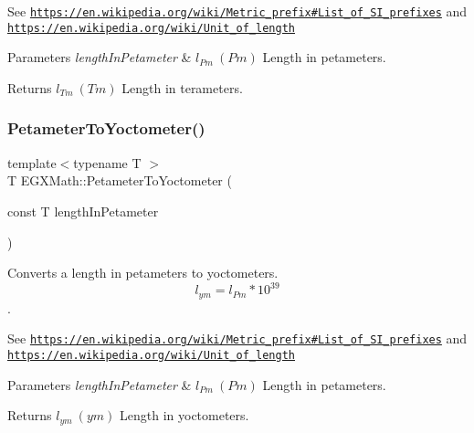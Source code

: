 See \href{https://en.wikipedia.org/wiki/Metric_prefix#List_of_SI_prefixes}{\tt https\+://en.\+wikipedia.\+org/wiki/\+Metric\+\_\+prefix\#\+List\+\_\+of\+\_\+\+S\+I\+\_\+prefixes} and \href{https://en.wikipedia.org/wiki/Unit_of_length}{\tt https\+://en.\+wikipedia.\+org/wiki/\+Unit\+\_\+of\+\_\+length} 
\begin{DoxyParams}{Parameters}
{\em length\+In\+Petameter} & $ l_{Pm}\ (Pm)$ Length in petameters. \\
\hline
\end{DoxyParams}
\begin{DoxyReturn}{Returns}
$ l_{Tm}\ (Tm)$ Length in terameters. 
\end{DoxyReturn}
\mbox{\label{group___e_g_x_math-_conversions-_length_conversions-_petameter-_s_i_ga6fd2701bf757e5a6ca26a0d506471433}} 
\subsubsection{\texorpdfstring{Petameter\+To\+Yoctometer()}{PetameterToYoctometer()}}
{\footnotesize\ttfamily template$<$typename T $>$ \\
T E\+G\+X\+Math\+::\+Petameter\+To\+Yoctometer (\begin{DoxyParamCaption}\item[{const T}]{length\+In\+Petameter }\end{DoxyParamCaption})}



Converts a length in petameters to yoctometers. \[ l_{ym}=l_{Pm} * 10^{39} \]. 

See \href{https://en.wikipedia.org/wiki/Metric_prefix#List_of_SI_prefixes}{\tt https\+://en.\+wikipedia.\+org/wiki/\+Metric\+\_\+prefix\#\+List\+\_\+of\+\_\+\+S\+I\+\_\+prefixes} and \href{https://en.wikipedia.org/wiki/Unit_of_length}{\tt https\+://en.\+wikipedia.\+org/wiki/\+Unit\+\_\+of\+\_\+length} 
\begin{DoxyParams}{Parameters}
{\em length\+In\+Petameter} & $ l_{Pm}\ (Pm)$ Length in petameters. \\
\hline
\end{DoxyParams}
\begin{DoxyReturn}{Returns}
$ l_{ym}\ (ym)$ Length in yoctometers. 
\end{DoxyReturn}
\mbox{\label{group___e_g_x_math-_conversions-_length_conversions-_petameter-_s_i_ga9ffc5119dfdd8427918e9f6cd6e4c2c8}} 
